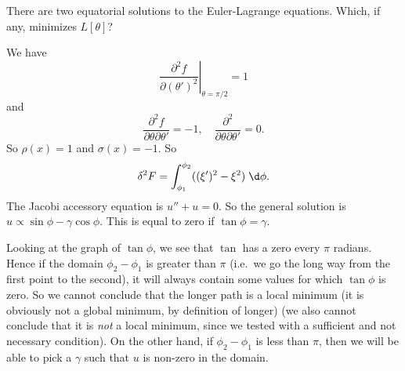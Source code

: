 \documentclass[a4paper]{article}
\begin{document}
\begin{eg}
  There are two equatorial solutions to the Euler-Lagrange equations. Which, if any, minimizes $L[\theta]$?
  \begin{center}
  \end{center}
  We have
  \[
    \left.\frac{\partial^2 f}{\partial (\theta')^2}\right|_{\theta = \pi/2} = 1
  \]
  and
  \[
    \frac{\partial^2 f}{\partial \theta \partial \theta'} = -1,\quad \frac{\partial^2}{\partial \theta\partial \theta'} = 0.
  \]
  So $\rho(x) = 1$ and $\sigma(x) = -1$. So
  \[
    \delta^2 F = \int_{\phi_1}^{\phi_2} ((\xi')^2 - \xi^2)\;\d \phi.
  \]
  The Jacobi accessory equation is $u'' + u = 0$. So the general solution is $u \propto \sin \phi - \gamma \cos\phi$. This is equal to zero if $\tan \phi = \gamma$.

  Looking at the graph of $\tan \phi$, we see that $\tan$ has a zero every $\pi$ radians. Hence if the domain $\phi_2 - \phi_1$ is greater than $\pi$ (i.e.\ we go the long way from the first point to the second), it will always contain some values for which $\tan \phi$ is zero. So we cannot conclude that the longer path is a local minimum (it is obviously not a global minimum, by definition of longer) (we also cannot conclude that it is \emph{not} a local minimum, since we tested with a sufficient and not necessary condition). On the other hand, if $\phi_2 - \phi_1$ is less than $\pi$, then we will be able to pick a $\gamma$ such that $u$ is non-zero in the domain.
\end{eg}
\end{document}
